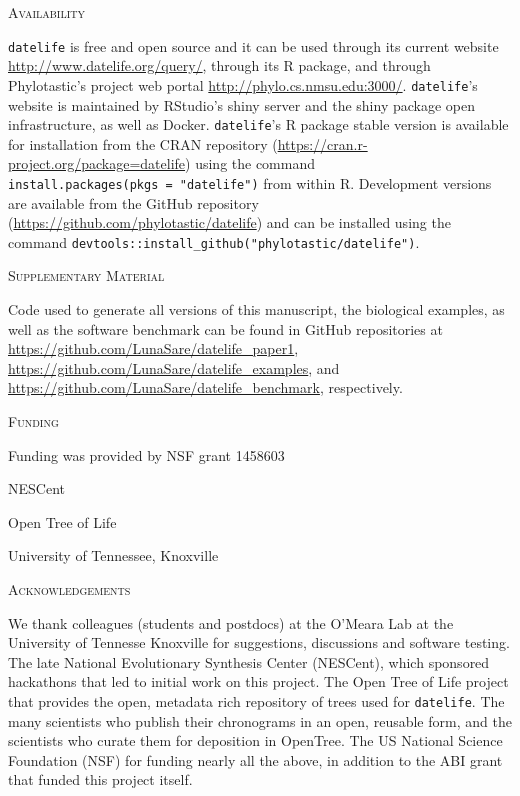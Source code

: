 \documentclass[]{article}
\begin{document}
\begin{center}
\textsc{Availability}
\end{center}

\texttt{datelife} is free and open source and it can be used through its current website
\url{http://www.datelife.org/query/}, through its R package, and through Phylotastic's project web portal \url{http://phylo.cs.nmsu.edu:3000/}.
\texttt{datelife}'s website is maintained by RStudio's shiny server and the shiny package open infrastructure, as well as Docker.
\texttt{datelife}'s R package stable version is available
for installation from the CRAN repository (\url{https://cran.r-project.org/package=datelife})
using the command \texttt{install.packages(pkgs\ =\ "datelife")} from within R. Development versions
are available from the GitHub repository (\url{https://github.com/phylotastic/datelife})
and can be installed using the command \texttt{devtools::install\_github("phylotastic/datelife")}.

\begin{center}
\textsc{Supplementary Material}
\end{center}

Code used to generate all versions of this manuscript, the biological examples, as well as the software benchmark can be found in GitHub repositories at \url{https://github.com/LunaSare/datelife_paper1}, \url{https://github.com/LunaSare/datelife_examples}, and \url{https://github.com/LunaSare/datelife_benchmark}, respectively.

\begin{center}
\textsc{Funding}
\end{center}

Funding was provided by NSF grant 1458603

NESCent

Open Tree of Life

University of Tennessee, Knoxville

\begin{center}
\textsc{Acknowledgements}
\end{center}

We thank colleagues (students and postdocs) at the O'Meara Lab at the University
of Tennesse Knoxville for suggestions, discussions and software testing.
The late National Evolutionary Synthesis Center (NESCent), which sponsored hackathons
that led to initial work on this project.
The Open Tree of Life project that provides the open, metadata rich repository of
trees used for \texttt{datelife}.
The many scientists who publish their chronograms in an open, reusable form, and
the scientists who curate them for deposition in OpenTree.
The US National Science Foundation (NSF) for funding nearly all the above, in addition
to the ABI grant that funded this project itself.
\end{document}
